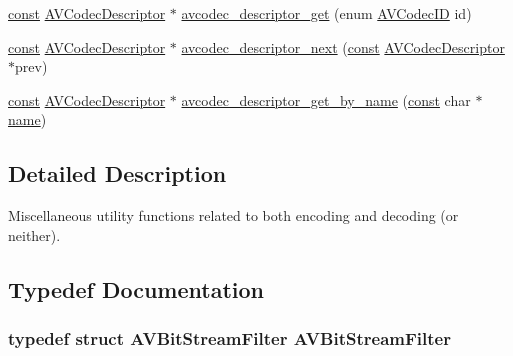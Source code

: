 \begin{DoxyCompactItemize}
\item 
\hyperlink{getopt1_8c_a2c212835823e3c54a8ab6d95c652660e}{const} \hyperlink{struct_a_v_codec_descriptor}{A\+V\+Codec\+Descriptor} $\ast$ \hyperlink{group__lavc__misc_gac09f8ddc2d4b36c5a85c6befba0d0888}{avcodec\+\_\+descriptor\+\_\+get} (enum \hyperlink{group__lavc__core_gaadca229ad2c20e060a14fec08a5cc7ce}{A\+V\+Codec\+ID} id)
\item 
\hyperlink{getopt1_8c_a2c212835823e3c54a8ab6d95c652660e}{const} \hyperlink{struct_a_v_codec_descriptor}{A\+V\+Codec\+Descriptor} $\ast$ \hyperlink{group__lavc__misc_ga909ef5261eafb1be1871f718353632bd}{avcodec\+\_\+descriptor\+\_\+next} (\hyperlink{getopt1_8c_a2c212835823e3c54a8ab6d95c652660e}{const} \hyperlink{struct_a_v_codec_descriptor}{A\+V\+Codec\+Descriptor} $\ast$prev)
\item 
\hyperlink{getopt1_8c_a2c212835823e3c54a8ab6d95c652660e}{const} \hyperlink{struct_a_v_codec_descriptor}{A\+V\+Codec\+Descriptor} $\ast$ \hyperlink{group__lavc__misc_ga199f854b030f24bd31d251f9d36f1392}{avcodec\+\_\+descriptor\+\_\+get\+\_\+by\+\_\+name} (\hyperlink{getopt1_8c_a2c212835823e3c54a8ab6d95c652660e}{const} char $\ast$\hyperlink{lib_2expat_8h_a1b49b495b59f9e73205b69ad1a2965b0}{name})
\end{DoxyCompactItemize}


\subsection{Detailed Description}
Miscellaneous utility functions related to both encoding and decoding (or neither). 

\subsection{Typedef Documentation}
\subsubsection[{\texorpdfstring{A\+V\+Bit\+Stream\+Filter}{AVBitStreamFilter}}]{\setlength{\rightskip}{0pt plus 5cm}typedef struct {\bf A\+V\+Bit\+Stream\+Filter}  {\bf A\+V\+Bit\+Stream\+Filter}}\hypertarget{group__lavc__misc_gaea3871dd20e820423b0abad16a7d0ac4}{}\label{group__lavc__misc_gaea3871dd20e820423b0abad16a7d0ac4}
